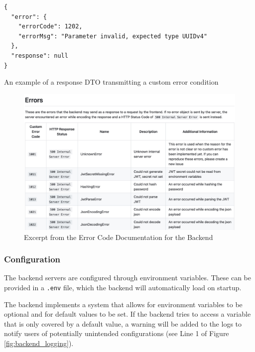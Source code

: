 \begin{listing}[htbp]
  \centering{}
  \begin{minipage}{0.725\textwidth}
  \begin{verbatim}
{
  "error": {
    "errorCode": 1202,
    "errorMsg": "Parameter invalid, expected type UUIDv4"
  },
  "response": null
}
  \end{verbatim}
  \end{minipage}
  \caption{An example of a response DTO transmitting a custom error condition}
  \label{listing:response_dto_error}
\end{listing}

\begin{figure}[htbp]
  \centering{}
  \includegraphics[width=\textwidth]{images/errors_documentation.jpg}
  \caption{Excerpt from the Error Code Documentation for the Backend}
  \label{fig:error_code_documentation}
\end{figure}

\subsubsection{Configuration}
The backend servers are configured through environment variables. These can be
provided in a \texttt{.env} file, which the backend will automatically load on
startup.

The backend implements a system that allows for environment variables to be
optional and for default values to be set. If the backend tries to access a
variable that is only covered by a default value, a warning will be added to the
logs to notify users of potentially unintended configurations (see Line 1 of
Figure \ref{fig:backend_logging}).

